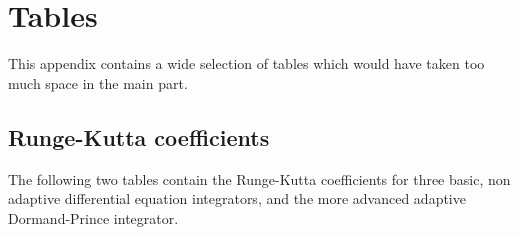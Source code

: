 \chapter{Tables}

This appendix contains a wide selection of tables which would have taken too much space in the main part.

\section{Runge-Kutta coefficients}

The following two tables contain the Runge-Kutta coefficients for three basic, non adaptive differential equation integrators, and the more advanced adaptive Dormand-Prince integrator.

\begin{table}[h]
	\caption[Constant step size integrator Runge-Kutta coefficients]{Constant step size integrator Runge-Kutta coefficients for the first-order Euler method, the second-order midpoint method and the classical fourth-order Runge-Kutta method.}
	\small
\end{table}
